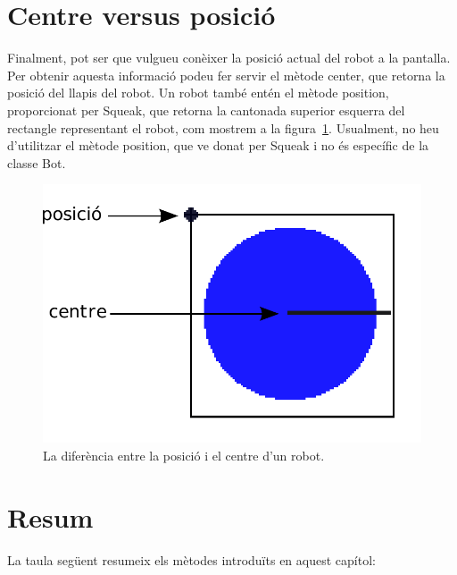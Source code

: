 \section{Centre versus posició}
Finalment, pot ser que vulgueu conèixer la posició actual del robot a la pantalla. Per obtenir aquesta informació podeu fer servir el mètode \textsf{center}, que retorna la posició del llapis del robot. Un robot també entén el mètode \textsf{position}, proporcionat per Squeak, que retorna la cantonada superior esquerra del rectangle representant el robot, com mostrem a la figura~\ref{fig2204}. Usualment, no heu d'utilitzar el mètode \textsf{position}, que ve donat per Squeak i no és específic de la classe \textsf{Bot}.  
\begin{figure}[h!]
\begin{center}
\includegraphics[scale=0.35]{Imatges/figura22-4}
\end{center}
\caption{La diferència entre la posició i el centre d'un robot.}
\label{fig2204}
\end{figure}

\section{Resum}

La taula següent resumeix els mètodes introduïts en aquest capítol:  
   

